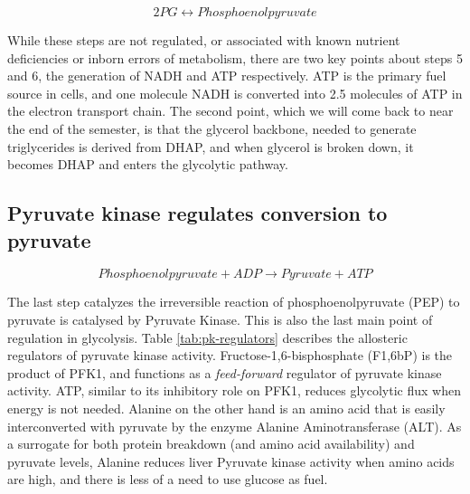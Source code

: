\documentclass{tufte-handout}
\begin{document}
\begin{equation}
2PG \leftrightarrow Phosphoenolpyruvate
\end{equation}

While these steps are not regulated, or associated with known nutrient deficiencies or inborn errors of metabolism, there are two key points about steps 5 and 6, the generation of NADH and ATP respectively.  ATP is the primary fuel source in cells, and one molecule NADH is converted into 2.5 molecules of ATP in the electron transport chain.  The second point, which we will come back to near the end of the semester, is that the glycerol backbone, needed to generate triglycerides is derived from DHAP, and when glycerol is broken down, it becomes DHAP and enters the glycolytic pathway.

\subsection{Pyruvate kinase regulates conversion to pyruvate}

\begin{equation}\label{eq:pk}
Phosphoenolpyruvate + ADP \rightarrow Pyruvate + ATP
\end{equation}

The last step catalyzes the irreversible reaction of phosphoenolpyruvate (PEP) to pyruvate is catalysed by Pyruvate Kinase.  This is also the last main point of regulation in glycolysis.  Table \ref{tab:pk-regulators} describes the allosteric regulators of pyruvate kinase activity.  Fructose-1,6-bisphosphate (F1,6bP) is the product of PFK1, and functions as a \emph{feed-forward} regulator of pyruvate kinase activity.  ATP, similar to its inhibitory role on PFK1, reduces glycolytic flux when energy is not needed.  Alanine on the other hand is an amino acid that is easily interconverted with pyruvate by the enzyme Alanine Aminotransferase (ALT).  As a surrogate for both protein breakdown (and amino acid availability) and pyruvate levels, Alanine reduces liver Pyruvate kinase activity when amino acids are high, and there is less of a need to use glucose as fuel.
\end{document}
